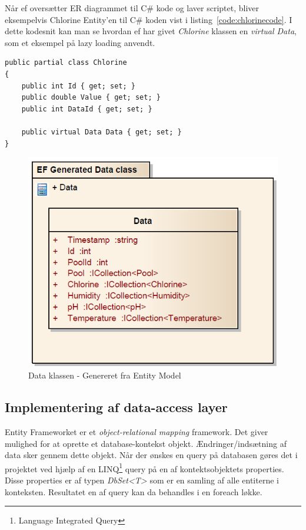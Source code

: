 Når \gls{ef} oversætter ER diagrammet til C\# kode og laver scriptet, bliver eksempelvis Chlorine Entity'en til C\# koden vist i listing~\ref{code:chlorinecode}. I dette kodesnit kan man se hvordan \gls{ef} har givet \textit{Chlorine} klassen en \textit{virtual Data}, som et eksempel på lazy loading anvendt.

\begin{minipage}[h]{\linewidth}
\begin{lstlisting}[caption=C\# kode repræsentationen af Chlorine entity.,label=code:chlorinecode]
public partial class Chlorine
{
	public int Id { get; set; }
	public double Value { get; set; }
	public int DataId { get; set; }
	
	public virtual Data Data { get; set; }
}
\end{lstlisting}
\end{minipage}

\begin{figure}
	\centering
	\includegraphics[width=0.5\linewidth]{figs/implementering/efGeneratedData.PNG}
	\caption{Data klassen - Genereret fra Entity Model}
	\label{fig:efGeneratedData}
\end{figure}

\subsection{Implementering af data-access layer}

Entity Frameworket er et \textit{object-relational mapping} framework. Det giver mulighed for at oprette et database-kontekst objekt. Ændringer/indsætning af data sker gennem dette objekt. Når der ønskes en query på databasen gøres det i projektet ved hjælp af en LINQ\footnote{Language Integrated Query} query på en af kontektsobjektets properties. Disse properties er af typen \textit{DbSet<T>} som er en samling af alle entiterne i konteksten. Resultatet en af query kan da behandles i en foreach løkke.

